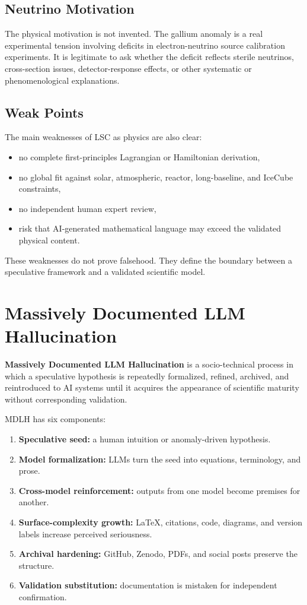 \documentclass[11pt,a4paper]{article}
\begin{document}
\subsection{Neutrino Motivation}

The physical motivation is not invented. The gallium anomaly is a real experimental tension involving deficits in electron-neutrino source calibration experiments. It is legitimate to ask whether the deficit reflects sterile neutrinos, cross-section issues, detector-response effects, or other systematic or phenomenological explanations.

\subsection{Weak Points}

The main weaknesses of LSC as physics are also clear:

\begin{itemize}
  \item no complete first-principles Lagrangian or Hamiltonian derivation,
  \item no global fit against solar, atmospheric, reactor, long-baseline, and IceCube constraints,
  \item no independent human expert review,
  \item risk that AI-generated mathematical language may exceed the validated physical content.
\end{itemize}

These weaknesses do not prove falsehood. They define the boundary between a speculative framework and a validated scientific model.

\section{Massively Documented LLM Hallucination}

\textbf{Massively Documented LLM Hallucination} is a socio-technical process in which a speculative hypothesis is repeatedly formalized, refined, archived, and reintroduced to AI systems until it acquires the appearance of scientific maturity without corresponding validation.

MDLH has six components:

\begin{enumerate}
  \item \textbf{Speculative seed:} a human intuition or anomaly-driven hypothesis.
  \item \textbf{Model formalization:} LLMs turn the seed into equations, terminology, and prose.
  \item \textbf{Cross-model reinforcement:} outputs from one model become premises for another.
  \item \textbf{Surface-complexity growth:} LaTeX, citations, code, diagrams, and version labels increase perceived seriousness.
  \item \textbf{Archival hardening:} GitHub, Zenodo, PDFs, and social posts preserve the structure.
  \item \textbf{Validation substitution:} documentation is mistaken for independent confirmation.
\end{enumerate}
\end{document}
